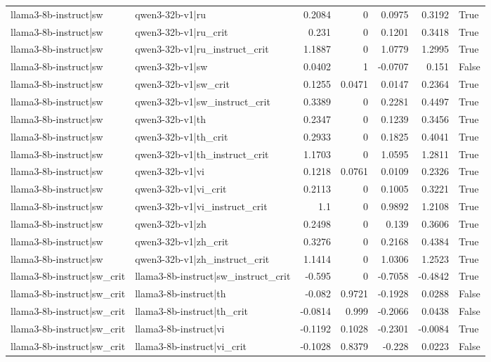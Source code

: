 \begin{table}
\begin{tabular}{l l r r r r l}
llama3-8b-instruct|sw & qwen3-32b-v1|ru & 0.2084 & 0 & 0.0975 & 0.3192 & True \\
llama3-8b-instruct|sw & qwen3-32b-v1|ru_crit & 0.231 & 0 & 0.1201 & 0.3418 & True \\
llama3-8b-instruct|sw & qwen3-32b-v1|ru_instruct_crit & 1.1887 & 0 & 1.0779 & 1.2995 & True \\
llama3-8b-instruct|sw & qwen3-32b-v1|sw & 0.0402 & 1 & -0.0707 & 0.151 & False \\
llama3-8b-instruct|sw & qwen3-32b-v1|sw_crit & 0.1255 & 0.0471 & 0.0147 & 0.2364 & True \\
llama3-8b-instruct|sw & qwen3-32b-v1|sw_instruct_crit & 0.3389 & 0 & 0.2281 & 0.4497 & True \\
llama3-8b-instruct|sw & qwen3-32b-v1|th & 0.2347 & 0 & 0.1239 & 0.3456 & True \\
llama3-8b-instruct|sw & qwen3-32b-v1|th_crit & 0.2933 & 0 & 0.1825 & 0.4041 & True \\
llama3-8b-instruct|sw & qwen3-32b-v1|th_instruct_crit & 1.1703 & 0 & 1.0595 & 1.2811 & True \\
llama3-8b-instruct|sw & qwen3-32b-v1|vi & 0.1218 & 0.0761 & 0.0109 & 0.2326 & True \\
llama3-8b-instruct|sw & qwen3-32b-v1|vi_crit & 0.2113 & 0 & 0.1005 & 0.3221 & True \\
llama3-8b-instruct|sw & qwen3-32b-v1|vi_instruct_crit & 1.1 & 0 & 0.9892 & 1.2108 & True \\
llama3-8b-instruct|sw & qwen3-32b-v1|zh & 0.2498 & 0 & 0.139 & 0.3606 & True \\
llama3-8b-instruct|sw & qwen3-32b-v1|zh_crit & 0.3276 & 0 & 0.2168 & 0.4384 & True \\
llama3-8b-instruct|sw & qwen3-32b-v1|zh_instruct_crit & 1.1414 & 0 & 1.0306 & 1.2523 & True \\
llama3-8b-instruct|sw_crit & llama3-8b-instruct|sw_instruct_crit & -0.595 & 0 & -0.7058 & -0.4842 & True \\
llama3-8b-instruct|sw_crit & llama3-8b-instruct|th & -0.082 & 0.9721 & -0.1928 & 0.0288 & False \\
llama3-8b-instruct|sw_crit & llama3-8b-instruct|th_crit & -0.0814 & 0.999 & -0.2066 & 0.0438 & False \\
llama3-8b-instruct|sw_crit & llama3-8b-instruct|vi & -0.1192 & 0.1028 & -0.2301 & -0.0084 & True \\
llama3-8b-instruct|sw_crit & llama3-8b-instruct|vi_crit & -0.1028 & 0.8379 & -0.228 & 0.0223 & False \\

\end{tabular}
\end{table}
